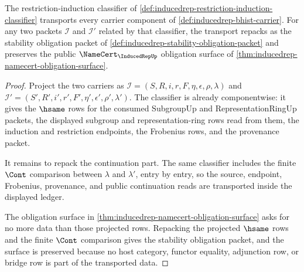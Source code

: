 \begin{theorem}
\label{thm:inducedrep-classifier-stability}
The restriction-induction classifier of
\autoref{def:inducedrep-restriction-induction-classifier} transports every
carrier component of \autoref{def:inducedrep-bhist-carrier}. For any two
packets $\mathcal{I}$ and $\mathcal{I}'$ related by that classifier, the
transport repacks as the stability obligation packet of
\autoref{def:inducedrep-stability-obligation-packet} and preserves the
public $\NameCert_{\InducedRepUp}$ obligation surface of
\autoref{thm:inducedrep-namecert-obligation-surface}.
\end{theorem}
\begin{proof}
Project the two carriers as
$\mathcal{I}=(S,R,i,r,F,\eta,\epsilon,\rho,\lambda)$ and
$\mathcal{I}'=(S',R',i',r',F',\eta',\epsilon',\rho',\lambda')$. The
classifier is already componentwise: it gives the $\hsame$ rows for the
consumed SubgroupUp and RepresentationRingUp packets, the displayed
subgroup and representation-ring rows read from them, the induction and
restriction endpoints, the Frobenius rows, and the provenance packet.

It remains to repack the continuation part. The same classifier includes
the finite $\Cont$ comparison between $\lambda$ and $\lambda'$, entry by
entry, so the source, endpoint, Frobenius, provenance, and public
continuation reads are transported inside the displayed ledger.

The obligation surface in
\autoref{thm:inducedrep-namecert-obligation-surface} asks for no more data
than those projected rows. Repacking the projected $\hsame$ rows and the
finite $\Cont$ comparison gives the stability obligation packet, and the
surface is preserved because no host category, functor equality, adjunction
row, or bridge row is part of the transported data.
\end{proof}

